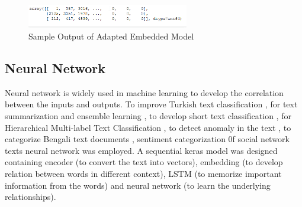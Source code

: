 \documentclass[conference]{IEEEtran}
\begin{document}
\begin{figure}[htbp]
\centerline{\includegraphics[width=200pt]{images/embed_output.png}}
\caption{Sample Output of Adapted Embedded Model}
\label{EmbedOutput}
\end{figure}

\subsection{Neural Network}
Neural network is widely used in machine learning to develop the correlation between the inputs and outputs. To improve Turkish text classification \cite{b30}, for text summarization and ensemble learning \cite{b31}, to develop short text classification \cite{b32}, for Hierarchical Multi-label Text Classification \cite{b33}, to detect anomaly in the text \cite{b34}, to categorize Bengali text documents \cite{b35}, sentiment categorization 0f social network texts \cite{b36} neural network was employed. A sequential keras model was designed containing encoder (to convert the text into vectors), embedding (to develop relation between words in different context), LSTM (to memorize important information from the words) and neural network (to learn the underlying relationships).
\end{document}
